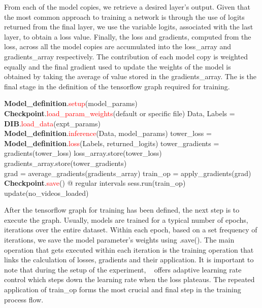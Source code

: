 \documentclass{llncs}
\begin{document}
From each of the model copies, we retrieve a desired layer's output.
Given that the most common approach to training a network is through the use of logits returned from the final layer, we use the variable logits, associated with the last layer, to obtain a loss value.
Finally, the loss and gradients, computed from the loss, across all the model copies are accumulated into the loss\_array and gradients\_array respectively.
The contribution of each model copy is weighted equally and the final gradient used to update the weights of the model is obtained by taking the average of value stored in the gradients\_array.
The is the final stage in the definition of the tensorflow graph required for training.

\begin{algorithmic}[H]
\State \textbf{Model\_definition}.\textcolor{red}{setup}(model\_params)
\State \textbf{Checkpoint}.\textcolor{red}{load\_param\_weights}(default or specific file)
\State Data, Labels = \textbf{DIB}.\textcolor{red}{load\_data}(expt\_params)
\\
\State \textbf{Model\_definition}.\textcolor{red}{inference}(Data, model\_params)
\State tower\_loss = \textbf{Model\_definition}.\textcolor{red}{loss}(Labels, returned\_logits)
\State tower\_gradients = gradients(tower\_loss)
\State loss\_array.store(tower\_loss)
\State gradients\_array.store(tower\_gradients)
\EndFor
\\
\State grad = average\_gradients(gradients\_array)
\State train\_op = apply\_gradients(grad)
\\
\State \textbf{Checkpoint}.\textcolor{red}{save}() @ regular intervals
\State sess.run(train\_op)
\State update(no\_videos\_loaded)
\EndWhile
\EndProcedure
\end{algorithmic}

After the tensorflow graph for training has been defined, the next step is to execute the graph.
Usually, models are trained for a typical number of epochs, iterations over the entire dataset.
Within each epoch, based on a set frequency of iterations, we save the model parameter's weights using \checkpoint.save().
The main operation that gets executed within each iteration is the training operation that links the calculation of losses, gradients and their application.
It is important to note that during the setup of the experiment, \acro~ offers adaptive learning rate control which steps down the learning rate when the loss plateaus.
The repeated application of train\_op forms the most crucial and final step in the training process flow.
\end{document}

